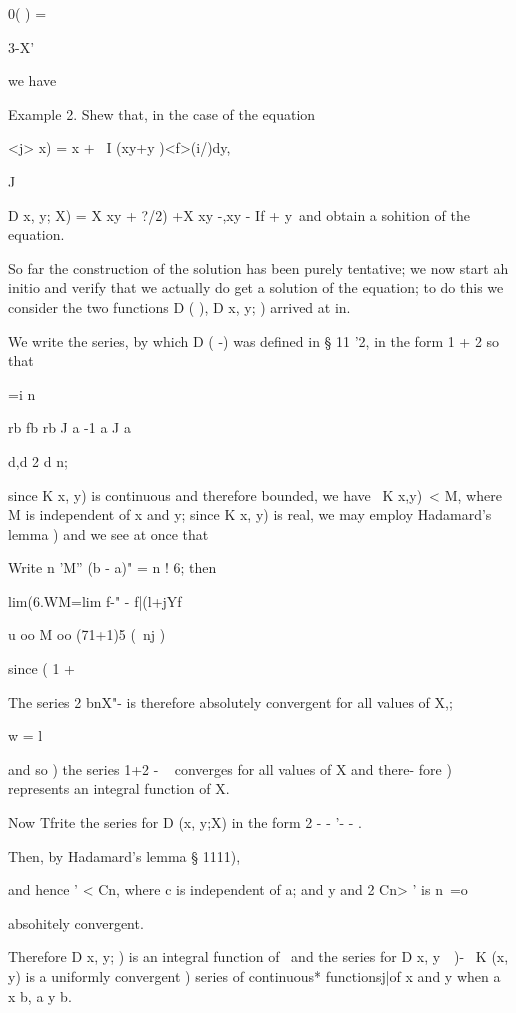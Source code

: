 0( ) =

3-X'

we have

Example 2. Shew that, in the case of the equation

<j> x) = x + \ I (xy+y )<f>(i/)dy,

J

D x, y; X) = X xy + ?/2) +X xy -,xy - If + y\ and obtain a sohition
of the equation.


So far the construction of the solution has been purely tentative; we
now start ah initio and verify that we actually do get a solution of
the equation; to do this we consider the two functions D ( ), D x,
y; ) arrived at in.

We write the series, by which D ( -) was defined in § 11 '2, in the
form 1 + 2 so that

 =i n\

rb fb rb J a -1 a J a

d,d 2  d n;

since K x, y) is continuous and therefore bounded, we have \ K x,y)\ <
M, where M is independent of x and y; since K x, y) is real, we may
employ Hadamard's lemma ) and we see at once that

Write n 'M'' (b - a)" = n ! 6; then

lim(6.WM=lim f-" - f|(l+jYf

u oo M oo (71+1)5 (\ nj )

since ( 1 +

The series 2 bnX"- is therefore absolutely convergent for all values
of X,;

w = l

and so ) the series 1+2 - ~ converges for all values of X and
there- fore ) represents an integral function of X.

Now Tfrite the series for D (x, y;X) in the form 2 - - '- - .

%
%

Then, by Hadamard's lemma § 1111),

and hence ' < Cn, where c is independent of a; and y and 2 Cn> ' is n\
=o

absohitely convergent.

Therefore D x, y; ) is an integral function of \ and the series for D
x, y\ \ )- \ K (x, y) is a uniformly convergent ) series of
continuous* functionsj|of x and y when a x b, a y b.

